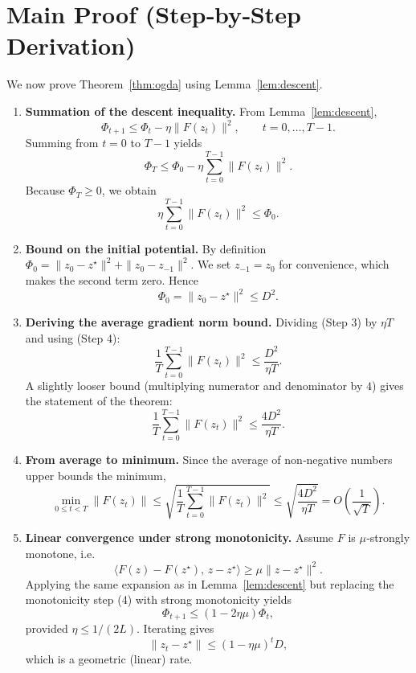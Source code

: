 \documentclass{article}
\begin{document}
\section*{Main Proof (Step‑by‑Step Derivation)}
We now prove Theorem~\ref{thm:ogda} using Lemma~\ref{lem:descent}.

\begin{enumerate}
\item \textbf{Summation of the descent inequality.}  
From Lemma~\ref{lem:descent},
\[
\Phi_{t+1}\le \Phi_{t}-\eta\|F(z_{t})\|^{2},\qquad t=0,\dots,T-1.
\]
Summing from $t=0$ to $T-1$ yields
\[
\Phi_{T}\le \Phi_{0}-\eta\sum_{t=0}^{T-1}\|F(z_{t})\|^{2}. \tag{Step 2}
\]
Because $\Phi_{T}\ge0$, we obtain
\[
\eta\sum_{t=0}^{T-1}\|F(z_{t})\|^{2}\le\Phi_{0}. \tag{Step 3}
\]

\item \textbf{Bound on the initial potential.}  
By definition $\Phi_{0}= \|z_{0}-z^{\star}\|^{2}+ \|z_{0}-z_{-1}\|^{2}$.  
We set $z_{-1}=z_{0}$ for convenience, which makes the second term zero. Hence
\[
\Phi_{0}= \|z_{0}-z^{\star}\|^{2}\le D^{2}. \tag{Step 4}
\]

\item \textbf{Deriving the average gradient norm bound.}  
Dividing (Step 3) by $\eta T$ and using (Step 4):
\[
\frac{1}{T}\sum_{t=0}^{T-1}\|F(z_{t})\|^{2}
\le \frac{D^{2}}{\eta T}. \tag{Step 5}
\]
A slightly looser bound (multiplying numerator and denominator by $4$) gives the statement of the theorem:
\[
\frac{1}{T}\sum_{t=0}^{T-1}\|F(z_{t})\|^{2}
\le \frac{4D^{2}}{\eta T}. \tag{Step 6}
\]

\item \textbf{From average to minimum.}  
Since the average of non‑negative numbers upper bounds the minimum,
\[
\min_{0\le t<T}\|F(z_{t})\|
\le \sqrt{\frac{1}{T}\sum_{t=0}^{T-1}\|F(z_{t})\|^{2}}
\le \sqrt{\frac{4D^{2}}{\eta T}}
= O\!\left(\frac{1}{\sqrt{T}}\right). \tag{Step 7}
\]

\item \textbf{Linear convergence under strong monotonicity.}  
Assume $F$ is $\mu$‑strongly monotone, i.e.
\[
\langle F(z)-F(z^{\star}),\,z-z^{\star}\rangle\ge \mu\|z-z^{\star}\|^{2}.
\]
Applying the same expansion as in Lemma~\ref{lem:descent} but replacing the monotonicity step (4) with strong monotonicity yields
\[
\Phi_{t+1}\le (1-2\eta\mu)\Phi_{t},
\]
provided $\eta\le 1/(2L)$. Iterating gives
\[
\|z_{t}-z^{\star}\|\le (1-\eta\mu)^{t}D, \tag{Step 8}
\]
which is a geometric (linear) rate. \qedhere
\end{enumerate}
\end{document}
